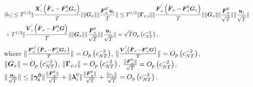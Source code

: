 \documentclass[12pt,a4paper,hyperref]{article}
\DeclarePairedDelimiter\abs{\lvert}{\rvert}%
\DeclarePairedDelimiter\norm{\lVert}{\rVert}%
\begin{document}
\begin{align}
\begin{split}
&\abs{b_{1}}\leq T^{1/2} \norm{\frac{ \boldsymbol{X}^{'}_{i}\left(\hat{\boldsymbol{F}}_{x}-\boldsymbol{F}^{0}_{x}\boldsymbol{G}_{x} \right) }{T}} \norm{\boldsymbol{G}_{x}}\norm{\frac{\boldsymbol{F}^{0'}_{x}\boldsymbol{u}_{i}}{T}}\leq T^{1/2} \norm{\boldsymbol{\Gamma}_{x,i}}\norm{\frac{\boldsymbol{F}^{'}_{x}\left(\hat{\boldsymbol{F}}_{x}-\boldsymbol{F}^{0}_{x}\boldsymbol{G}_{x} \right)}{T}}\norm{\boldsymbol{G}_{x}} \norm{\frac{\boldsymbol{F}^{0}_{x}}{\sqrt{T}}}\norm{\frac{\boldsymbol{u}_{i}}{\sqrt{T}}}\\
&+T^{1/2} \norm{\frac{\boldsymbol{V}^{'}_{i}\left(\hat{\boldsymbol{F}}_{x}-\boldsymbol{F}^{0}_{x}\boldsymbol{G} \right)}{T} } \norm{\boldsymbol{G}_{x}}\norm{\frac{\boldsymbol{F}^{0}_{x}}{\sqrt{T}}} \norm{\frac{\boldsymbol{u}_{i}}{\sqrt{T}}}=\sqrt{T}O_{p}\left(c^{-2}_{NT} \right),
\end{split}
\end{align}
where $\norm{\frac{\boldsymbol{F}^{0'}_{x}\left(\hat{\boldsymbol{F}}_{x}-\boldsymbol{F}^{0}_{x}\boldsymbol{G}_{x} \right) }{T}}= O_{p}\left(c^{-2}_{NT}\right)$, $\norm{\frac{\boldsymbol{V}^{'}_{i}\left(\hat{\boldsymbol{F}}_{x}-\boldsymbol{F}^{0}_{x}\boldsymbol{G} \right)}{T} }=  O_{p}\left(c^{-2}_{NT}\right)$, $ \norm{\boldsymbol{G}_{x}}=  O_{p}\left(c^{-2}_{NT}\right)$, $\norm{\boldsymbol{\Gamma}_{x,i}}=  O_{p}\left(c^{-2}_{NT}\right)$, $\frac{ \norm{\boldsymbol{F}^{0}_{x}}}{\sqrt{T}}=  O_{p}\left(c^{-2}_{NT}\right)$, $ \norm{\frac{\boldsymbol{u}_{i}}{\sqrt{T}}}\leq \norm{\boldsymbol{\gamma^{0}_{i}}} \frac{\norm{\boldsymbol{F}^{0}_{y}}}{\sqrt{T}}+\norm{\boldsymbol{\lambda}^{0}_{i}} \frac{ \norm{\boldsymbol{F}^{0}_{y}} }{\sqrt{T}}+ \frac{\norm{\varepsilon_{i} } }{\sqrt{T}}=O_{p}\left(c^{-2}_{NT}\right).$  
\end{document}
